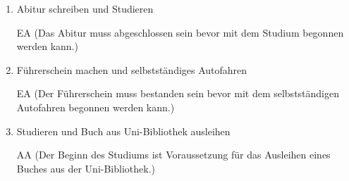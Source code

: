 \documentclass{bschlangaul-aufgabe}
\begin{document}
\begin{enumerate}

\item Abitur schreiben und Studieren

\begin{bAntwort}
EA (Das Abitur muss abgeschlossen sein bevor mit dem Studium begonnen
werden kann.)
\end{bAntwort}


\item Führerschein machen und selbstständiges Autofahren

\begin{bAntwort}
EA (Der Führerschein muss bestanden sein bevor mit dem selbstständigen
Autofahren begonnen werden kann.)
\end{bAntwort}


\item Studieren und Buch aus Uni-Bibliothek ausleihen

\begin{bAntwort}
AA (Der Beginn des Studiums ist Voraussetzung für das Ausleihen eines
Buches aus der Uni-Bibliothek.)
\end{bAntwort}
\end{enumerate}
\end{document}
